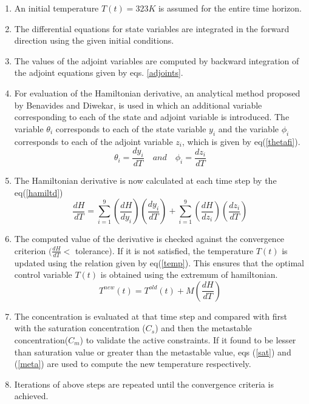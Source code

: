 \documentclass[3p,times,authoryear]{elsarticle}
\begin{document}
\begin{enumerate}
\item An initial temperature $T(t) = 323 K$ is assumed for the entire time horizon.
\item The differential equations for state variables are integrated in the forward direction using the given initial conditions.
\item The values of the adjoint variables are computed by backward integration of the adjoint equations given by eqs. \ref{adjoints}.
\item For evaluation of the Hamiltonian derivative, an analytical method proposed by Benavides and Diwekar\cite{benavides}, is used in which an additional variable corresponding to each of the state and adjoint variable is introduced. The variable $\theta_{i}$ corresponds to each of the state variable $y_{i}$ and the variable $\phi_{i}$ corresponds to each of the adjoint variable $z_{i}$, which is given by eq(\ref{thetafi}).
\begin{equation}
\theta_{i} = \frac{dy_{i}}{dT} \quad and \quad \phi_{i} = \frac{dz_{i}}{dT} \label{thetafi} 
\end{equation}
\item The Hamiltonian derivative is now calculated at each time step by the eq(\ref{hamiltd})
\begin{equation}
\frac{dH}{dT} = \sum_{i=1}^{9} \left( \frac{dH}{dy_{i}}\right)\left(	\frac{dy_{i}}{dT} \right) + \sum_{i=1}^{9} \left(\frac{dH}{dz_{i}}\right)\left(\frac{dz_{i}}{dT} \right) \label{hamiltd}
\end{equation}
\item The  computed value of the derivative is checked against the convergence criterion $(\frac{dH}{dT}<$ tolerance). If it is not satisfied, the temperature $T(t)$ is updated using the relation \cite{yenkie} given by eq(\ref{temp}). This ensures that the optimal control variable $T(t)$ is obtained using the extremum of hamiltonian. 
\begin{equation} 
T^{new}(t) = T^{old}(t) + M\left(\frac{dH}{dT} \right) \label{temp}
\end{equation}
\item The concentration is evaluated  at that time step and compared with first with the saturation concentration ($C_{s}$) and then the metastable concentration($C_{m}$) to validate the active constraints. If it found to be lesser than saturation value or greater than the metastable value, eqs (\ref{sat}) and (\ref{meta}) are used to compute the new temperature respectively. 
\item Iterations of above steps are repeated until the convergence criteria is achieved.
\end{enumerate}
\end{document}
